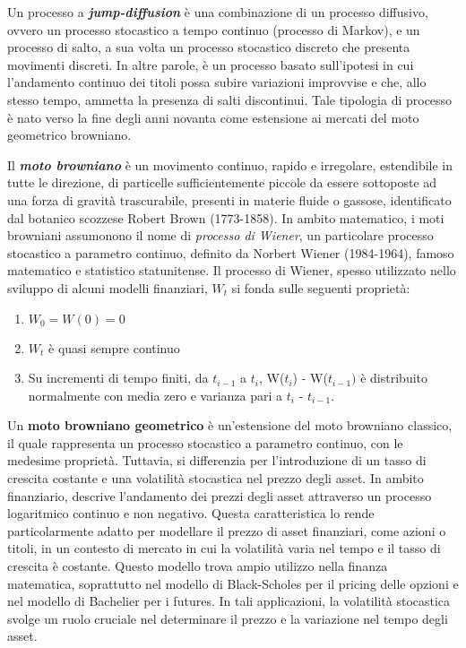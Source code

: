 \documentclass[12pt,a4paper]{report}
\begin{document}
Un processo a \textbf{\textit{jump-diffusion}} è una combinazione di un processo diffusivo, ovvero un processo stocastico a tempo continuo (processo di Markov), e un processo di salto, a sua volta un processo stocastico discreto che presenta movimenti discreti. In altre parole, è un processo basato sull’ipotesi in cui l’andamento continuo dei titoli possa subire variazioni improvvise e che, allo stesso tempo, ammetta la presenza di salti discontinui. Tale tipologia di processo è nato verso la fine degli anni novanta come estensione ai mercati del moto geometrico browniano.  


Il \textbf{\textit{moto browniano}} è un movimento continuo, rapido e irregolare, estendibile in tutte le direzione, di particelle sufficientemente piccole da essere sottoposte ad una forza di gravità trascurabile, presenti in materie fluide o gassose, identificato dal botanico scozzese Robert Brown (1773-1858).
In ambito matematico, i moti browniani assumonono il nome di \textit{processo di Wiener}, un particolare processo stocastico a parametro continuo, definito da Norbert Wiener (1984-1964), famoso matematico e statistico statunitense. Il processo di Wiener, spesso utilizzato nello sviluppo di alcuni modelli finanziari, $W_t$ si fonda sulle seguenti proprietà:

\begin{enumerate}
    \item $W_0 = W(0) = 0$
    \item $W_t$ è quasi sempre continuo
    \item Su incrementi di tempo finiti, da $t_{i-1}$ a $t_i$, W($t_i$) - W($t_{i-1})$ è distribuito normalmente con media zero e varianza pari a $t_i$ - $t_{i-1}$.  
    \end{enumerate}

Un \textbf{moto browniano geometrico} è un'estensione del moto browniano classico, il quale rappresenta un processo stocastico a parametro continuo, con le medesime proprietà. Tuttavia, si differenzia per l'introduzione di un tasso di crescita costante e una volatilità stocastica nel prezzo degli asset.
In ambito finanziario, descrive l'andamento dei prezzi degli asset attraverso un processo logaritmico continuo e non negativo. Questa caratteristica lo rende particolarmente adatto per modellare il prezzo di asset finanziari, come azioni o titoli, in un contesto di mercato in cui la volatilità varia nel tempo e il tasso di crescita è costante.
Questo modello trova ampio utilizzo nella finanza matematica, soprattutto nel modello di Black-Scholes per il pricing delle opzioni e nel modello di Bachelier per i futures. In tali applicazioni, la volatilità stocastica svolge un ruolo cruciale nel determinare il prezzo e la variazione nel tempo degli asset.
\end{document}
